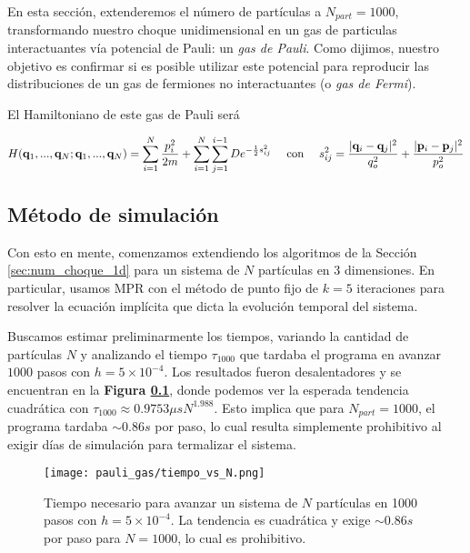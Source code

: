 En esta sección, extenderemos el número de partículas a $N_{part}=1000$, transformando nuestro choque unidimensional en un gas de particulas interactuantes vía potencial
de Pauli: un \textit{gas de Pauli}.
Como dijimos, nuestro objetivo es confirmar si es posible utilizar este potencial para reproducir las distribuciones de un gas de fermiones no interactuantes (o \textit{gas de Fermi}).

El Hamiltoniano de este gas de Pauli será

\begin{equation}{\label{eq:pauli_gas_ham}}
 H(\mathbf{q}_1, ...,\mathbf{q}_N; \mathbf{q}_1,..., \mathbf{q}_N) = \sum_{i=1}^{N} \frac{p_i^2}{2m} + \sum_{i=1}^N\sum_{j=1}^{i-1} De^{-\frac{1}{2}s_{ij}^2}
 \quad \text{ con } \quad s_{ij}^2 = \frac{|\mathbf{q}_i-\mathbf{q}_j|^2}{q_o^2} + \frac{|\mathbf{p}_i-\mathbf{p}_j|^2}{p_o^2}
\end{equation}

\subsection{Método de simulación}

Con esto en mente, comenzamos extendiendo los algoritmos de la Sección \ref{sec:num_choque_1d} para un sistema de $N$ partículas en 3 dimensiones.
En particular, usamos MPR con el método de punto fijo de $k=5$ iteraciones para resolver la ecuación implícita que dicta la evolución temporal del sistema.

Buscamos estimar preliminarmente los tiempos, variando la cantidad de partículas $N$ y analizando el tiempo $\tau_{1000}$ que tardaba el programa en avanzar
$1000$ pasos con $h=5\times10^{-4}$.
Los resultados fueron desalentadores y se encuentran en la \textbf{Figura \ref{}}, donde podemos ver la esperada tendencia cuadrática con 
$\tau_{1000} \approx 0.9753\mu s N^{1.988}$. 
Esto implica que para $N_{part}=1000$, el programa tardaba $\sim0.86s$ por paso, lo cual resulta simplemente prohibitivo al exigir días de simulación para termalizar el sistema.

\begin{figure}[h]
	\centering
	\texttt{[image: pauli\_gas/tiempo\_vs\_N.png]}
	\caption{Tiempo necesario para avanzar un sistema de $N$ partículas en 1000 pasos con $h=5\times10^{-4}$. 
	La tendencia es cuadrática y exige $\sim0.86s$ por paso para $N=1000$, lo cual es prohibitivo.}
	\label{fig:ej_diag_fases}
\end{figure}

